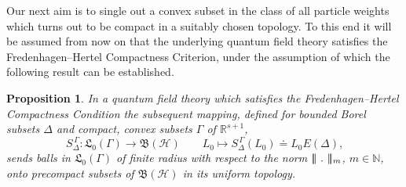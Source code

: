 \documentclass[11pt,twoside,openright]{report}
\theoremstyle{definition}
\theoremstyle{plain}
\newtheorem{Pro}[Def]{Proposition}
\theoremstyle{remark}
\theoremstyle{assumption}
\newcommand{\Norm}[1]{\lvert \negthinspace \lvert \negthinspace \lvert
  #1 \rvert \negthinspace \rvert \negthinspace \rvert}
\newcommand{\Nbb}{\mathbb{N}}
\newcommand{\Lfrak}{\mathfrak{L}}
\newcommand{\Rsone}{\mathbb{R}^{s + 1}}
\newcommand{\BH}{\mathfrak{B} ( \mathscr{H} )}
\newcommand{\ED}{E ( \Delta )}
\newcommand{\SDG}{S_\Delta^{\, \Gamma}}
\begin{document}
Our next aim is to single out a convex subset in the class of all
particle weights which turns out to be compact in a suitably chosen
topology. To this end it will be assumed from now on that the
underlying quantum field theory satisfies the Fredenhagen--Hertel
Compactness Criterion, under the assumption of which the following
result can be established.
\begin{Pro}
  In a quantum field theory which satisfies the Fredenhagen--Hertel
  Compactness Condition the subsequent mapping, defined for bounded
  Borel subsets $\Delta$ and compact, convex subsets $\Gamma$ of
  $\Rsone$,
  \begin{equation*}
    \SDG : \Lfrak_0 ( \Gamma ) \rightarrow \BH \qquad L_0 \mapsto \SDG (
    L_0 ) \doteq L_0 \ED \text{,}
  \end{equation*}
  sends balls in $\Lfrak_0 ( \Gamma )$ of finite radius with respect
  to the norm $\Norm{~.~}_m$, $m \in \Nbb$, onto precompact subsets of
  $\BH$ in its uniform topology.
\end{Pro}
\end{document}
